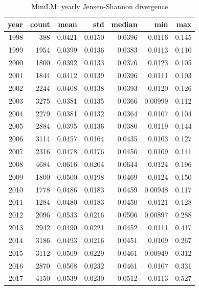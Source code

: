 \begin{table}[ht]
\centering
\caption{MiniLM: yearly Jensen-Shannon divergence}
\label{tab:minilm_jsd_all_years}
\begin{tabular}{rrrrrrr}
\toprule
year & count & mean & std & median & min & max \\
\midrule
1998 & 388 & 0.0421 & 0.0150 & 0.0396 & 0.0116 & 0.145 \\
1999 & 1954 & 0.0399 & 0.0136 & 0.0383 & 0.0113 & 0.110 \\
2000 & 1800 & 0.0392 & 0.0133 & 0.0376 & 0.0123 & 0.105 \\
2001 & 1844 & 0.0412 & 0.0139 & 0.0396 & 0.0111 & 0.103 \\
2002 & 2244 & 0.0408 & 0.0138 & 0.0393 & 0.0120 & 0.126 \\
2003 & 3275 & 0.0381 & 0.0135 & 0.0366 & 0.00999 & 0.112 \\
2004 & 2279 & 0.0381 & 0.0132 & 0.0364 & 0.0107 & 0.104 \\
2005 & 2884 & 0.0395 & 0.0136 & 0.0380 & 0.0119 & 0.144 \\
2006 & 3114 & 0.0457 & 0.0164 & 0.0435 & 0.0103 & 0.127 \\
2007 & 2316 & 0.0478 & 0.0176 & 0.0456 & 0.0109 & 0.141 \\
2008 & 4684 & 0.0616 & 0.0204 & 0.0644 & 0.0124 & 0.196 \\
2009 & 1800 & 0.0500 & 0.0198 & 0.0469 & 0.0124 & 0.150 \\
2010 & 1778 & 0.0486 & 0.0183 & 0.0459 & 0.00948 & 0.117 \\
2011 & 1284 & 0.0480 & 0.0183 & 0.0450 & 0.0121 & 0.128 \\
2012 & 2096 & 0.0533 & 0.0216 & 0.0506 & 0.00897 & 0.288 \\
2013 & 2942 & 0.0490 & 0.0221 & 0.0452 & 0.0111 & 0.417 \\
2014 & 3186 & 0.0493 & 0.0216 & 0.0451 & 0.0109 & 0.267 \\
2015 & 3112 & 0.0509 & 0.0229 & 0.0461 & 0.00949 & 0.312 \\
2016 & 2870 & 0.0508 & 0.0232 & 0.0461 & 0.0107 & 0.331 \\
2017 & 4150 & 0.0539 & 0.0230 & 0.0512 & 0.0113 & 0.527 \\
\bottomrule
\end{tabular}
\end{table}
